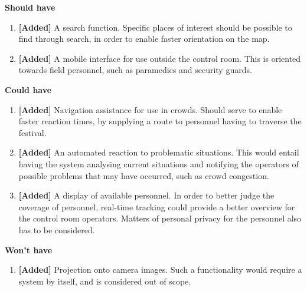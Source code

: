 \textbf{Should have}
\begin{enumerate}[resume]
    \item \textbf{[Added]} A search function. Specific places of interest should be possible to find through search, in order to enable faster orientation on the map.
    \item \label{itm:mobile_req} \textbf{[Added]} A mobile interface for use outside the control room. This is oriented towards field personnel, such as paramedics and security guards.
\end{enumerate}

\textbf{Could have}
\begin{enumerate}[resume]
    \item \textbf{[Added]} Navigation assistance for use in crowds. Should serve to enable faster reaction times, by supplying a route to personnel having to traverse the festival.
    \item \textbf{[Added]} An automated reaction to problematic situations. This would entail having the system analysing current situations and notifying the operators of possible problems that may have occurred, such as crowd congestion.
    \item \textbf{[Added]} A display of available personnel. In order to better judge the coverage of personnel, real-time tracking could provide a better overview for the control room operators. Matters of personal privacy for the personnel also has to be considered.
\end{enumerate}

\textbf{Won't have}
\begin{enumerate}[resume]
    \item \textbf{[Added]} Projection onto camera images. Such a functionality would require a system by itself, and is considered out of scope.
\end{enumerate}

